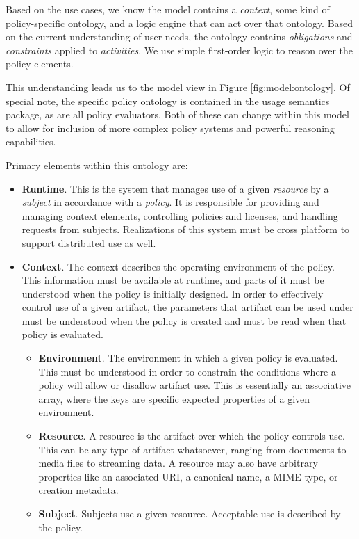 Based on the use cases, we know the model contains a \emph{context}, some kind of policy-specific ontology, and a logic engine that can act over that ontology.  Based on the current understanding of user needs, the ontology contains \emph{obligations} and \emph{constraints} applied to \emph{activities}.  We use simple first-order logic to reason over the policy elements.

This understanding leads us to the model view in Figure \ref{fig:model:ontology}.  Of special note, the specific policy ontology is contained in the usage semantics package, as are all policy evaluators.  Both of these can change within this model to allow for inclusion of more complex policy systems and powerful reasoning capabilities.

Primary elements within this ontology are:
\begin{itemize}
\item \textbf{Runtime}.  This is the system that manages use of a given \emph{resource} by a \emph{subject} in accordance with a \emph{policy}.  It is responsible for providing and managing context elements, controlling policies and licenses, and handling requests from subjects.  Realizations of this system must be cross platform to support distributed use as well.
\item \textbf{Context}.  The context describes the operating environment of the policy.  This information must be available at runtime, and parts of it must be understood when the policy is initially designed.  In order to effectively control use of a given artifact, the parameters that artifact can be used under must be understood when the policy is created and must be read when that policy is evaluated.
\begin{itemize}
\item \textbf{Environment}.  The environment in which a given policy is evaluated.  This must be understood in order to constrain the conditions where a policy will allow or disallow artifact use.  This is essentially an associative array, where the keys are specific expected properties of a given environment.
\item \textbf{Resource}.  A resource is the artifact over which the policy controls use.  This can be any type of artifact whatsoever, ranging from documents to media files to streaming data.  A resource may also have arbitrary properties like an associated URI, a canonical name, a MIME type, or creation metadata.
\item \textbf{Subject}.  Subjects use a given resource.  Acceptable use is described by the policy.

\end{itemize}
\end{itemize}
